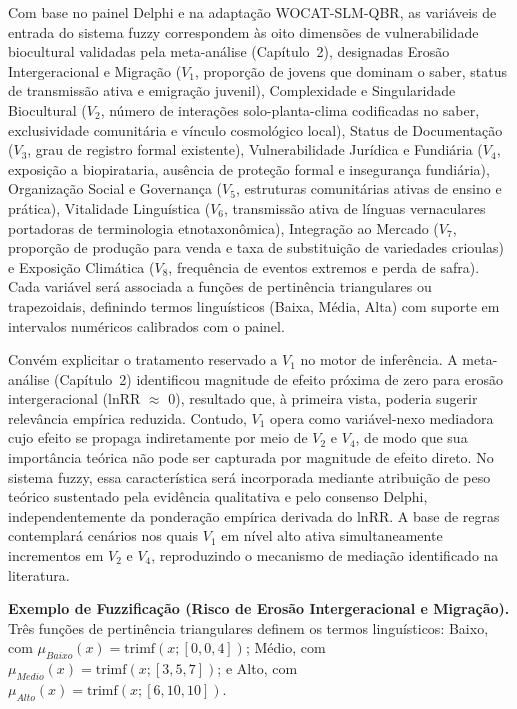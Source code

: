 Com base no painel Delphi e na adaptação WOCAT-SLM-QBR, as variáveis de entrada do sistema fuzzy correspondem às oito dimensões de vulnerabilidade biocultural validadas pela meta-análise (Capítulo~2), designadas Erosão Intergeracional e Migração ($V_1$, proporção de jovens que dominam o saber, status de transmissão ativa e emigração juvenil), Complexidade e Singularidade Biocultural ($V_2$, número de interações solo-planta-clima codificadas no saber, exclusividade comunitária e vínculo cosmológico local), Status de Documentação ($V_3$, grau de registro formal existente), Vulnerabilidade Jurídica e Fundiária ($V_4$, exposição a biopirataria, ausência de proteção formal e insegurança fundiária), Organização Social e Governança ($V_5$, estruturas comunitárias ativas de ensino e prática), Vitalidade Linguística ($V_6$, transmissão ativa de línguas vernaculares portadoras de terminologia etnotaxonômica), Integração ao Mercado ($V_7$, proporção de produção para venda e taxa de substituição de variedades crioulas) e Exposição Climática ($V_8$, frequência de eventos extremos e perda de safra). Cada variável será associada a funções de pertinência triangulares ou trapezoidais, definindo termos linguísticos (Baixa, Média, Alta) com suporte em intervalos numéricos calibrados com o painel.

Convém explicitar o tratamento reservado a $V_1$ no motor de inferência. A meta-análise (Capítulo~2) identificou magnitude de efeito próxima de zero para erosão intergeracional (lnRR $\approx$ 0), resultado que, à primeira vista, poderia sugerir relevância empírica reduzida. Contudo, $V_1$ opera como variável-nexo mediadora cujo efeito se propaga indiretamente por meio de $V_2$ e $V_4$, de modo que sua importância teórica não pode ser capturada por magnitude de efeito direto. No sistema fuzzy, essa característica será incorporada mediante atribuição de peso teórico sustentado pela evidência qualitativa e pelo consenso Delphi, independentemente da ponderação empírica derivada do lnRR. A base de regras contemplará cenários nos quais $V_1$ em nível alto ativa simultaneamente incrementos em $V_2$ e $V_4$, reproduzindo o mecanismo de mediação identificado na literatura.

\textbf{Exemplo de Fuzzificação (Risco de Erosão Intergeracional e Migração).} Três funções de pertinência triangulares definem os termos linguísticos: Baixo, com $\mu_{Baixo}(x) = \text{trimf}(x; [0, 0, 4])$; Médio, com $\mu_{Medio}(x) = \text{trimf}(x; [3, 5, 7])$; e Alto, com $\mu_{Alto}(x) = \text{trimf}(x; [6, 10, 10])$.

